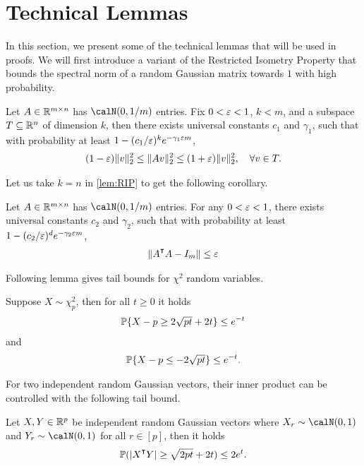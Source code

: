 \section{Technical Lemmas}

In this section, we present some of the technical lemmas that will be used in proofs.
We will first introduce a variant of the Restricted Isometry Property that bounds the spectral norm of a random Gaussian matrix towards $1$ with high probability.

\begin{lemma}\label{lem:RIP}
    Let $A\in {\mathbb{R}^{m\times n}}$ has \iid $\calN(0,1/m)$ entries. Fix $0<\varepsilon<1$, $k < m$, and a subspace $T\subseteq \mathbb{R}^n$ of dimension $k$, then there exists universal constants $c_1$ and $\gamma_1$, such that with probability at least $1-(c_1/\varepsilon)^k e^{-\gamma_1\varepsilon m}$,
    \begin{align*}
    (1-\varepsilon)\|v\|^2_2 \leq \|Av\|^2_2 \leq (1+\varepsilon)\|v\|^2_2, \quad \forall v\in T.
    \end{align*}
\end{lemma}
Let us take $k = n$ in \cref{lem:RIP} to get the following corollary.
\begin{corollary}\label{cor:RIP}
    Let $A\in {\mathbb{R}^{m\times n}}$ has \iid $\calN(0,1/m)$ entries. For any $0<\varepsilon<1$, there exists universal constants $c_2$ and $\gamma_2$, such that with probability at least $1-(c_2/\varepsilon)^d e^{-\gamma_2\varepsilon m}$,
    \begin{align*}
        \|A\transpose A - I_m\|\leq \eps
    \end{align*}
\end{corollary}

Following lemma gives tail bounds for $\chi^2$ random variables.
\begin{lemma}\label{lem:chi-squared-tail}
    Suppose $X\sim \chi^2_p$, then for all $t\geq 0$ it holds
    \begin{align*}
        \operatorname{\mathbb{P}}\{X-p \geq 2\sqrt{pt} + 2t\} \leq e^{-t}
    \end{align*}
    and
    \begin{align*}
        \operatorname{\mathbb{P}}\{X-p \leq -2\sqrt{pt}\} \leq e^{-t}.
    \end{align*}
\end{lemma}

For two independent random Gaussian vectors, their inner product can be controlled with the following tail bound.
\begin{lemma}\label{lem:inner-product-tail}
    Let $X,Y\in{\mathbb{R}^{p}}$ be independent random Gaussian vectors where $X_r\sim\calN(0,1)$ and $Y_r\sim\calN(0,1)$ for all $r\in[p]$, then it holds
    \begin{align*}
        \prob(|X\transpose Y| \geq \sqrt{2pt} + 2t) \leq 2e^t.
    \end{align*}
\end{lemma}
